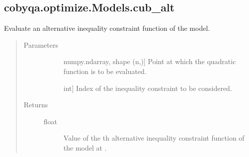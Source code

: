 \documentclass[letterpaper,10pt,english]{sphinxmanual}
\begin{document}
\begin{fulllineitems}
\begin{fulllineitems}
\begin{quote}
\begin{description}
\begin{description}
\end{description}

\end{description}\end{quote}

\end{fulllineitems}



\subsection{cobyqa.optimize.Models.cub\_alt}
\label{\detokenize{refs/generated/cobyqa.optimize.Models.cub_alt:cobyqa-optimize-models-cub-alt}}\label{\detokenize{refs/generated/cobyqa.optimize.Models.cub_alt::doc}}

\begin{fulllineitems}
\label{\detokenize{refs/generated/cobyqa.optimize.Models.cub_alt:cobyqa.optimize.Models.cub_alt}}
\sphinxAtStartPar
Evaluate an alternative inequality constraint function of the model.
\begin{quote}\begin{description}
\item[{Parameters}] \leavevmode\begin{description}
\item[{}] \leavevmode{[}numpy.ndarray, shape (n,){]}
\sphinxAtStartPar
Point at which the quadratic function is to be evaluated.

\item[{}] \leavevmode{[}int{]}
\sphinxAtStartPar
Index of the inequality constraint to be considered.

\end{description}

\item[{Returns}] \leavevmode\begin{description}
\item[{float}] \leavevmode
\sphinxAtStartPar
Value of the \sphinxhyphen{}th alternative inequality constraint function of
the model at .

\end{description}

\end{description}\end{quote}


\end{fulllineitems}
\end{fulllineitems}
\end{document}
